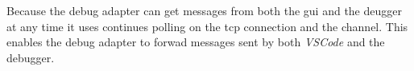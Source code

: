 Because the debug adapter can get messages from both the \acrshort{gui} and the deugger at any time it uses continues polling on the \gls{tcp} connection and the channel.
This enables the debug adapter to forwad messages sent by both \emph{VSCode} and the debugger.

